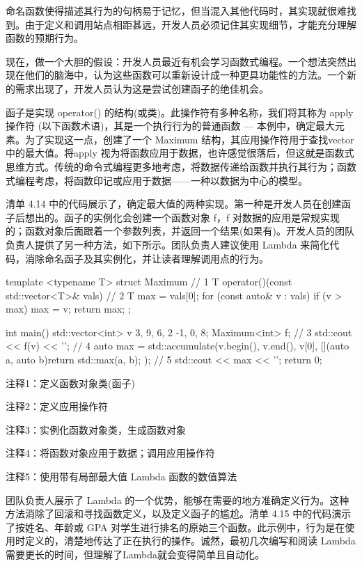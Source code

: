 
命名函数使得描述其行为的句柄易于记忆，但当混入其他代码时，其实现就很难找到。由于定义和调用站点相距甚远，开发人员必须记住其实现细节，才能充分理解函数的预期行为。

现在，做一个大胆的假设：开发人员最近有机会学习函数式编程。一个想法突然出现在他们的脑海中，认为这些函数可以重新设计成一种更具功能性的方法。一个新的需求出现了，开发人员认为这是尝试创建函子的绝佳机会。

函子是实现 operator() 的结构(或类)。此操作符有多种名称，我们将其称为 apply 操作符 (以下函数术语)，其是一个执行行为的普通函数 — 本例中，确定最大元素。为了实现这一点，创建了一个 Maximum 结构，其应用操作符用于查找vector中的最大值。将apply 视为将函数应用于数据，也许感觉很落后，但这就是函数式思维方式。传统的命令式编程更多地考虑，将数据传递给函数并执行其行为；函数式编程考虑，将函数印记或应用于数据——一种以数据为中心的模型。

清单 4.14 中的代码展示了，确定最大值的两种实现。第一种是开发人员在创建函子后想出的。函子的实例化会创建一个函数对象 f，f 对数据的应用是常规实现的；函数对象后面跟着一个参数列表，并返回一个结果(如果有)。开发人员的团队负责人提供了另一种方法，如下所示。团队负责人建议使用 Lambda 来简化代码，消除命名函子及其实例化，并让读者理解调用点的行为。


\begin{cpp}
template <typename T>
struct Maximum { // 1
  T operator()(const std::vector<T>& vals) { // 2
    T max = vals[0];
    for (const auto& v : vals)
      if (v > max)
        max = v;
    return max;
  }
};

int main() {
  std::vector<int> v {3, 9, 6, 2 -1, 0, 8};
  Maximum<int> f; // 3
  std::cout << f(v) << '\n'; // 4
  auto max = std::accumulate(v.begin(), v.end(), v[0],
    [](auto a, auto b){return std::max(a, b); }); // 5
  std::cout << max << '\n';
  return 0;
}
\end{cpp}

{\footnotesize
注释1：定义函数对象类(函子)

注释2：定义应用操作符

注释3：实例化函数对象类，生成函数对象

注释4：将函数对象应用于数据；调用应用操作符

注释5：使用带有局部最大值 Lambda 函数的数值算法
}


团队负责人展示了 Lambda 的一个优势，能够在需要的地方准确定义行为。这种方法消除了回滚和寻找函数定义，以及定义函子的尴尬。清单 4.15 中的代码演示了按姓名、年龄或 GPA 对学生进行排名的原始三个函数。此示例中，行为是在使用时定义的，清楚地传达了正在执行的操作。诚然，最初几次编写和阅读 Lambda 需要更长的时间，但理解了Lambda就会变得简单且自动化。

